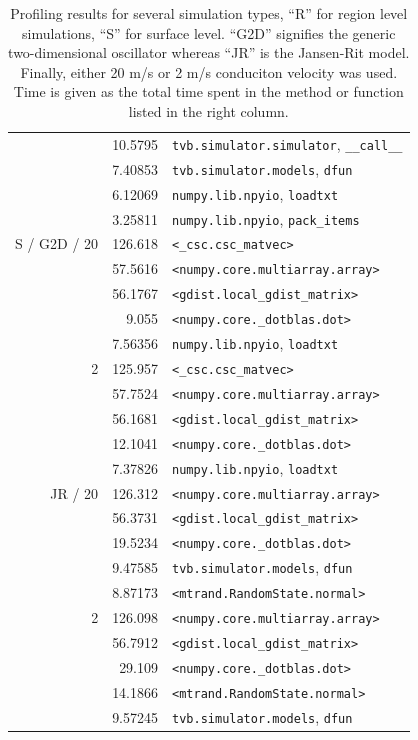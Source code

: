 \documentclass{bioinfo}
\begin{document}
\begin{table}
{\begin{tabular}{r | r | l }
		&         10.5795 & \texttt{tvb.simulator.simulator}, \texttt{\_\_call\_\_} \\
		 &         7.40853 & \texttt{tvb.simulator.models}, \texttt{dfun} \\
		 &         6.12069 & \texttt{numpy.lib.npyio}, \texttt{loadtxt} \\
		 &         3.25811 & \texttt{numpy.lib.npyio}, \texttt{pack\_items} \\
		\hline
		S / G2D / 20 &         126.618 & \texttt{<\_csc.csc\_matvec>} \\
		&         57.5616 & \texttt{<numpy.core.multiarray.array>} \\
		 &         56.1767 & \texttt{<gdist.local\_gdist\_matrix>} \\
		 &           9.055 & \texttt{<numpy.core.\_dotblas.dot>} \\
		 &         7.56356 & \texttt{numpy.lib.npyio}, \texttt{loadtxt} \\
		\hline
		2 &         125.957 & \texttt{<\_csc.csc\_matvec>} \\
		&         57.7524 & \texttt{<numpy.core.multiarray.array>} \\
		 &         56.1681 & \texttt{<gdist.local\_gdist\_matrix>} \\
		 &         12.1041 & \texttt{<numpy.core.\_dotblas.dot>} \\
		 &         7.37826 & \texttt{numpy.lib.npyio}, \texttt{loadtxt} \\
		\hline
		JR / 20 &         126.312 & \texttt{<numpy.core.multiarray.array>} \\
		&         56.3731 & \texttt{<gdist.local\_gdist\_matrix>} \\
		 &         19.5234 & \texttt{<numpy.core.\_dotblas.dot>} \\
		 &         9.47585 & \texttt{tvb.simulator.models}, \texttt{dfun} \\
		 &         8.87173 & \texttt{<mtrand.RandomState.normal>} \\
		\hline
		2 &         126.098 & \texttt{<numpy.core.multiarray.array>} \\
		&         56.7912 & \texttt{<gdist.local\_gdist\_matrix>} \\
		 &          29.109 & \texttt{<numpy.core.\_dotblas.dot>} \\
		 &         14.1866 & \texttt{<mtrand.RandomState.normal>} \\
		 &         9.57245 & \texttt{tvb.simulator.models}, \texttt{dfun} \\
		\hline

		\end{tabular}}
		\caption{Profiling results for several simulation types, ``R'' for region 
		level simulations, ``S'' for surface level. ``G2D'' signifies the generic
		two-dimensional oscillator whereas ``JR'' is the Jansen-Rit model. Finally,
		either 20 m/s or 2 m/s conduciton velocity was used. Time is given as the
		total time spent in the method or function listed in the right column.}
		\label{tab:profiling}
		\end{table}
\end{document}
